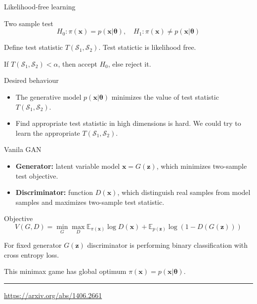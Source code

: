 \documentclass{beamer}
\newcommand{\bx}{\mathbf{x}}
\newcommand{\bz}{\mathbf{z}}
\newcommand{\bbE}{\mathbb{E}}
\newcommand{\cS}{\mathcal{S}}
\newcommand{\btheta}{\boldsymbol{\theta}}
\begin{document}
\begin{frame}{Likelihood-free learning}
		\begin{block}{Two sample test}
			\vspace{-0.3cm}
			\[
				H_0: \pi(\bx) = p(\bx | \btheta), \quad H_1: \pi(\bx) \neq p(\bx | \btheta)
			\]
	\end{block}
	Define test statistic $T(\cS_1, \cS_2)$. Test statictic is likelihood free.
	
	If $T(\cS_1, \cS_2) < \alpha$, then accept $H_0$, else reject it.
	
	\begin{block}{Desired behaviour}
		\begin{itemize}
			\item The generative model $p(\bx | \btheta)$ minimizes the value of test statistic~$T(\cS_1, \cS_2)$.
			\item Find appropriate test statistic in high dimensions is hard. We could try to learn the appropriate $T(\cS_1, \cS_2)$.
		\end{itemize}
	\end{block}
\end{frame}
\begin{frame}{Vanila GAN}
	\begin{itemize}
		\item \textbf{Generator:} latent variable model $\bx = G(\bz)$, which minimizes two-sample test objective.
		\item \textbf{Discriminator:} function $D(\bx)$, which distinguish real samples from model samples and maximizes two-sample test statistic.
	\end{itemize}
	\begin{block}{Objective}
		\[
			V(G, D) = \min_{G} \max_D \bbE_{\pi(\bx)} \log D(\bx) + \bbE_{p(\bz)} \log (1 - D(G(\bz)))
		\]
	\end{block}
	For fixed generator $G(\bz)$ discriminator is performing binary classification with cross entropy loss.
	
	 This minimax game has global optimum $\pi(\bx) = p(\bx | \btheta)$.
	 \vfill
	 \hrule\medskip
	 {\scriptsize \href{https://arxiv.org/abs/1406.2661}{https://arxiv.org/abs/1406.2661}}
\end{frame}
\end{document}
